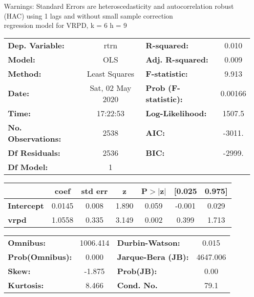 Warnings: \newline
 [1] Standard Errors are heteroscedasticity and autocorrelation robust (HAC) using 1 lags and without small sample correction\\ 

regression model for VRPD, k = 6 h = 9\begin{center}
\begin{tabular}{lclc}
\toprule
\textbf{Dep. Variable:}    &       rtrn       & \textbf{  R-squared:         } &     0.010   \\
\textbf{Model:}            &       OLS        & \textbf{  Adj. R-squared:    } &     0.009   \\
\textbf{Method:}           &  Least Squares   & \textbf{  F-statistic:       } &     9.913   \\
\textbf{Date:}             & Sat, 02 May 2020 & \textbf{  Prob (F-statistic):} &  0.00166    \\
\textbf{Time:}             &     17:22:53     & \textbf{  Log-Likelihood:    } &    1507.5   \\
\textbf{No. Observations:} &        2538      & \textbf{  AIC:               } &    -3011.   \\
\textbf{Df Residuals:}     &        2536      & \textbf{  BIC:               } &    -2999.   \\
\textbf{Df Model:}         &           1      & \textbf{                     } &             \\
\bottomrule
\end{tabular}
\begin{tabular}{lcccccc}
                   & \textbf{coef} & \textbf{std err} & \textbf{z} & \textbf{P$> |$z$|$} & \textbf{[0.025} & \textbf{0.975]}  \\
\midrule
\textbf{Intercept} &       0.0145  &        0.008     &     1.890  &         0.059        &       -0.001    &        0.029     \\
\textbf{vrpd}      &       1.0558  &        0.335     &     3.149  &         0.002        &        0.399    &        1.713     \\
\bottomrule
\end{tabular}
\begin{tabular}{lclc}
\textbf{Omnibus:}       & 1006.414 & \textbf{  Durbin-Watson:     } &    0.015  \\
\textbf{Prob(Omnibus):} &   0.000  & \textbf{  Jarque-Bera (JB):  } & 4647.006  \\
\textbf{Skew:}          &  -1.875  & \textbf{  Prob(JB):          } &     0.00  \\
\textbf{Kurtosis:}      &   8.466  & \textbf{  Cond. No.          } &     79.1  \\
\bottomrule
\end{tabular}
\end{center}

